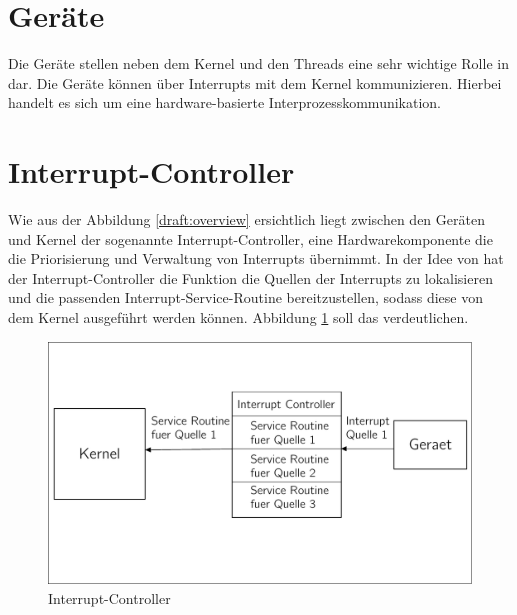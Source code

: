 \section{Ger\"ate}
Die Ger\"ate stellen neben dem Kernel und den Threads eine sehr wichtige Rolle in \mops dar. Die Ger\"ate k\"onnen \"uber Interrupts mit dem Kernel kommunizieren. Hierbei handelt es sich um eine hardware-basierte Interprozesskommunikation.
\section{Interrupt-Controller}
Wie aus der Abbildung \ref{draft:overview} ersichtlich liegt zwischen den Ger\"aten und Kernel der sogenannte Interrupt-Controller, eine Hardwarekomponente die die Priorisierung und Verwaltung von Interrupts \"ubernimmt. In der Idee von \mops hat der Interrupt-Controller die Funktion die Quellen der Interrupts zu lokalisieren und die passenden Interrupt-Service-Routine bereitzustellen, sodass diese von dem Kernel ausgef\"uhrt werden k\"onnen. Abbildung \ref{draft:draft-vic} soll das verdeutlichen.
\begin{figure}[h!]
	\centering
	\includegraphics[scale=0.60]{common/draft-vic.pdf}	
	\caption{Interrupt-Controller}
	\label{draft:draft-vic}
\end{figure}
\newpage
